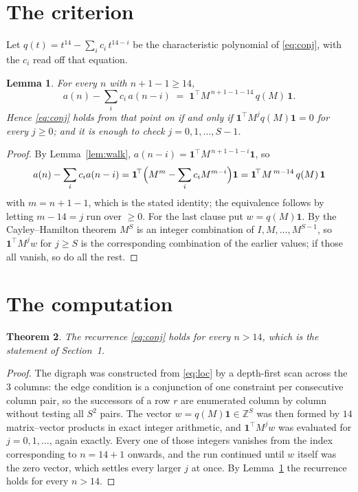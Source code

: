 \documentclass[11pt,a4paper]{article}
\theoremstyle{plain}
\newtheorem{theorem}{Theorem}
\newtheorem{lemma}[theorem]{Lemma}
\theoremstyle{definition}
\begin{document}
\section{The criterion}

Let $q(t)=t^{14}-\sum_i c_i\,t^{14-i}$ be the characteristic polynomial of
\eqref{eq:conj}, with the $c_i$ read off that equation.

\begin{lemma}\label{lem:crit}
For every $n$ with $n+1-1\ge14$,
\[
a(n)-\sum_i c_i\,a(n-i)\;=\;\mathbf{1}^{\!\top}M^{\,n+1-1-14}\,q(M)\,\mathbf{1} .
\]
Hence \eqref{eq:conj} holds from that point on if and only if
$\mathbf{1}^{\!\top}M^{j}q(M)\mathbf{1}=0$ for every $j\ge0$; and it is enough to check
$j=0,1,\dots,S-1$.
\end{lemma}

\begin{proof}
By Lemma~\ref{lem:walk}, $a(n-i)=\mathbf{1}^{\!\top}M^{\,n+1-1-i}\mathbf{1}$, so
\[
a(n)-\sum_i c_i a(n-i)
=\mathbf{1}^{\!\top}\Bigl(M^{m}-\sum_i c_i M^{m-i}\Bigr)\mathbf{1}
=\mathbf{1}^{\!\top}M^{\,m-14}\,q(M)\,\mathbf{1}
\]
with $m=n+1-1$, which is the stated identity; the equivalence follows by letting
$m-14=j$ run over $\ge0$. For the last clause put $w=q(M)\mathbf{1}$. By the
Cayley--Hamilton theorem $M^{S}$ is an integer combination of $I,M,\dots,M^{S-1}$, so
$\mathbf{1}^{\!\top}M^{j}w$ for $j\ge S$ is the corresponding combination of the earlier
values; if those all vanish, so do all the rest.
\end{proof}

\section{The computation}

\begin{theorem}
The recurrence \eqref{eq:conj} holds for every $n>14$, which is the statement of
Section~1.
\end{theorem}

\begin{proof}
The digraph was constructed from \eqref{eq:loc} by a depth-first scan across the $3$
columns: the edge condition is a conjunction of one constraint per consecutive column
pair, so the successors of a row $r$ are enumerated column by column without testing all
$S^2$ pairs. The vector $w=q(M)\mathbf{1}\in\mathbb{Z}^{S}$ was then formed by $14$
matrix--vector products in exact integer arithmetic, and $\mathbf{1}^{\!\top}M^{j}w$ was
evaluated for $j=0,1,\dots$, again exactly. Every one of those integers vanishes from the
index corresponding to $n=14+1$ onwards, and the run continued until $w$ itself was the
zero vector, which settles every larger $j$ at once. By Lemma~\ref{lem:crit} the recurrence
holds for every $n>14$.
\end{proof}
\end{document}

